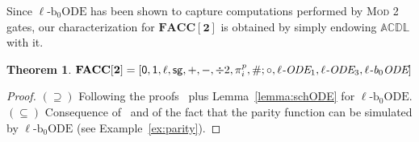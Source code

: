 \documentclass[11pt, oneside]{article}
\newcommand{\ACDL}{\mathbb{ACDL}}
\newcommand{\fun}[1]{\mathsf{#1}}
\newcommand{\FACC}{\mathbf{FACC[2]}}
\newtheorem{theorem}{Theorem}
\theoremstyle{definition}
\newcommand{\ODEACC}{\ell\text{-ODE}_{\text{FACC[2]}}}
\newcommand{\schODE}{\ell\text{-b}_0\text{ODE}}
\begin{document}
Since $\schODE$ has been shown to capture computations performed by \textsc{Mod 2} gates, our characterization for $\FACC$ is obtained by simply endowing $\ACDL$ with it.




\begin{theorem}\label{theorem:FACC}
$\FACC
%
        = [\fun{0}, \fun{1}, \ell, \fun{sg}, +, -, \div 2, \pi^p_i, \#; \circ, \ell\emph{-ODE}_1, \ell\emph{-ODE}_3, \ell\emph{-b}_0\emph{ODE}]
 $
\end{theorem}


\begin{proof}
    $(\supseteq)$ Following the proofs~\cite[Prop. 12, 17]{ADK24a} plus Lemma~\ref{lemma:schODE} for $\schODE$. 
    $(\subseteq)$ Consequence of~\cite[Th. 18]{ADK24a} and of the fact that the parity function can be simulated by $\schODE$ (see Example~\ref{ex:parity}).
\end{proof}
\end{document}
